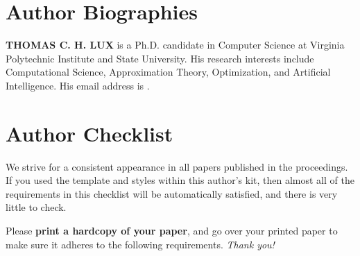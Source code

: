 \documentclass{scspaperproc}
\theoremstyle{scsthe}
\begin{document}
\section*{Author Biographies}

\textbf{\uppercase{THOMAS C. H. LUX}} is a Ph.D. candidate in Computer Science at Virginia Polytechnic Institute and State University. His research interests include Computational Science, Approximation Theory, Optimization, and Artificial Intelligence. His email address is .

\newpage

\appendix

\section{Author Checklist}
We strive for a consistent appearance in all papers published in the proceedings. If you used the template and styles within this author’s kit, then almost all of the requirements in this checklist will be automatically satisfied, and there is very little to check.

Please \textbf{print a hardcopy of your paper}, and go over your printed paper to make sure it adheres to the following requirements. \textit{Thank you!}
\end{document}
